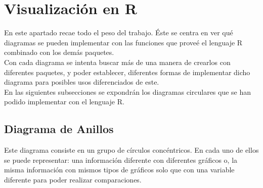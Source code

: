 \documentclass{article}\usepackage[]{graphicx}\usepackage[]{color}
\begin{document}
\section{Visualizaci\'on en R}
En este apartado recae todo el peso del trabajo. \'Este se centra en ver qu\'e diagramas se pueden implementar con las funciones que prove\'e el lenguaje R combinado con los dem\'as paquetes.~\\
Con cada diagrama se intenta buscar m\'as de una manera de crearlos con diferentes paquetes, y poder establecer, diferentes formas de implementar dicho diagrama para posibles usos diferenciados de este.~\\
En las siguientes subsecciones se expondr\'an los diagramas circulares que se han podido implementar con el lenguaje R.
\subsection{Diagrama de Anillos}\label{ssec:anillos}
Este diagrama consiste en un grupo de c\'irculos conc\'entricos. En cada uno de ellos se puede representar: una informaci\'on diferente con diferentes gr\'aficos o, la misma informaci\'on con mismos tipos de gr\'aficos solo que con una variable diferente para poder realizar comparaciones.
\end{document}

